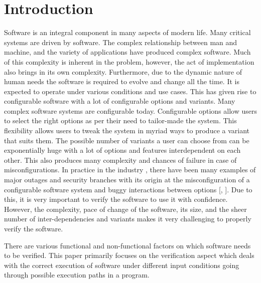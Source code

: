 \documentclass[ runningheads,
               a4paper]{llncs}
\begin{document}
\section{Introduction}
Software is an integral component in many aspects of modern life. Many critical systems are driven by software. The complex relationship between man and machine, and the variety of applications have produced complex software. Much of this complexity is inherent in the problem, however, the act of implementation also brings in its own complexity. Furthermore, due to the dynamic nature of human needs the software is required to evolve and change all the time. It is expected to operate under various conditions and use cases. This has given rise to configurable software with a lot of configurable options and variants. Many complex software systems are configurable today. Configurable options allow users to select the right options as per their need to tailor-made the system. This flexibility allows users to tweak the system in myriad ways to produce a variant that suits them. The possible number of variants a user can choose from can be exponentially huge with a lot of options and features interdependent on each other. This also produces many complexity and chances of failure in case of misconfigurations. In practice in the industry \cite[Holistic configuration management at Facebook]{tang2015holistic}, there have been many examples of major outages and security branches with its origin at the misconfiguration of a configurable software system and buggy interactions between options [\cite{han2016empirical}, \cite{kenner2021safety}]. Due to this, it is very important to verify the software to use it with confidence. However, the complexity, pace of change of the software, its size, and the sheer number of inter-dependencies and variants makes it very challenging to properly verify the software.


There are various functional and non-functional factors on which software needs to be verified. This paper primarily focuses on the verification aspect which deals with the correct execution of software under different input conditions going through possible execution paths in a program.
\end{document}
